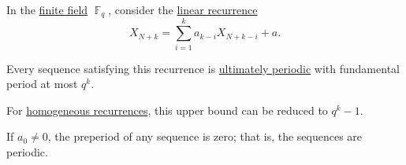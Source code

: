 \begin{proposition}\label{thm:linear_recurrence_finite_field_periodic}
  In the \hyperref[def:finite_field]{finite field} \( \BbbF_q \), consider the \hyperref[def:linear_recurrence]{linear recurrence}
  \begin{equation*}
    X_{N+k} = \sum_{i=1}^k a_{k-i} X_{N+k-i} + a.
  \end{equation*}

  \begin{thmenum}
     Every sequence satisfying this recurrence is \hyperref[def:ultimately_periodic_sequence]{ultimately periodic} with fundamental period at most \( q^k \).

     For \hyperref[def:homogeneous_linear_recurrence]{homogeneous recurrences}, this upper bound can be reduced to \( q^k - 1 \).

     If \( a_0 \neq 0 \), the preperiod of any sequence is zero; that is, the sequences are periodic.
  \end{thmenum}
\end{proposition}
